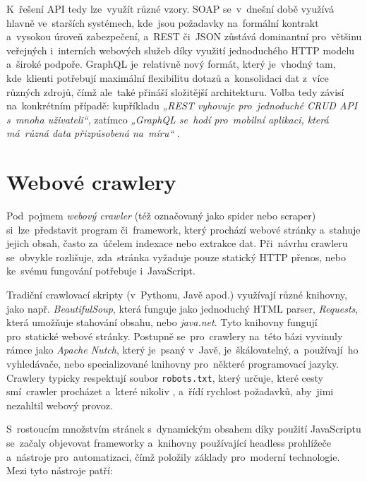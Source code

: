 K~řešení API tedy lze~využít různé vzory. SOAP se~v~dnešní době využívá
hlavně ve~starších systémech, kde~jsou požadavky na~formální kontrakt
a~vysokou úroveň zabezpečení, a~REST či~JSON zůstává dominantní pro~většinu
veřejných i~interních webových služeb díky využití jednoduchého HTTP modelu
a~široké podpoře. GraphQL je~relativně nový formát, který je~vhodný tam,
kde~klienti potřebují maximální flexibilitu dotazů a~konsolidaci dat
z~více různých zdrojů, čímž ale~také přináší složitější architekturu. Volba
tedy závisí na~konkrétním případě: kupříkladu \emph{„REST vyhovuje
pro~jednoduché CRUD API s~mnoha uživateli“}, zatímco \emph{„GraphQL se~hodí
pro~mobilní aplikaci, která má~různá data přizpůsobená na~míru“}
\cite{YHVfLHsNlUItkF6G,Sj7FFY7SXnJ6m41T}. %

\section{Webové crawlery}
\label{sec:research-crawlers}

Pod~pojmem \emph{webový crawler} (též označovaný jako spider nebo scraper)
si~lze~představit program či~framework, který prochází webové stránky
a~stahuje jejich obsah, často za~účelem indexace nebo extrakce dat.
Při~návrhu crawleru se~obvykle rozlišuje, zda~stránka vyžaduje pouze
statický HTTP přenos, nebo ke~svému fungování potřebuje i~JavaScript.
\cite{Naik20230310} %

Tradiční crawlovací skripty (v~Pythonu, Javě apod.) využívají různé knihovny,
jako např. \emph{BeautifulSoup}, která funguje jako jednoduchý HTML parser,
\emph{Requests}, která umožňuje stahování obsahu, nebo \emph{java.net}. Tyto
knihovny fungují pro~statické webové stránky. Postupně se~pro~crawlery
na~této bázi vyvinuly rámce jako \emph{Apache Nutch}, který je~psaný v~Javě,
je~škálovatelný, a~používají~ho vyhledávače, nebo specializované knihovny
pro~některé programovací jazyky. Crawlery typicky respektují soubor
\texttt{robots.txt}, který určuje, které cesty smí~crawler procházet
a~které nikoliv
\cite{YHVfLHsNlUItkF6G,adi8S69Mmo0Mi7FC,Ceri2013}, %
a~řídí rychlost požadavků, aby~jimi nezahltil webový provoz.

S~rostoucím množstvím stránek s~dynamickým obsahem díky použití JavaScriptu
se~začaly objevovat frameworky a~knihovny používající headless prohlížeče
a~nástroje pro~automatizaci, čímž položily základy pro~moderní technologie.
Mezi tyto nástroje patří:

